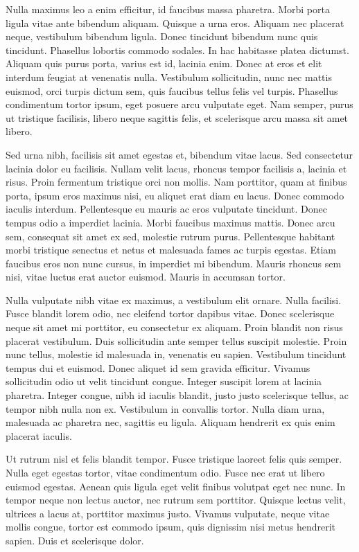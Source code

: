 Nulla maximus leo a enim efficitur, id faucibus massa pharetra. Morbi porta ligula vitae ante bibendum aliquam. Quisque a urna eros. Aliquam nec placerat neque, vestibulum bibendum ligula. Donec tincidunt bibendum nunc quis tincidunt. Phasellus lobortis commodo sodales. In hac habitasse platea dictumst. Aliquam quis purus porta, varius est id, lacinia enim. Donec at eros et elit interdum feugiat at venenatis nulla. Vestibulum sollicitudin, nunc nec mattis euismod, orci turpis dictum sem, quis faucibus tellus felis vel turpis. Phasellus condimentum tortor ipsum, eget posuere arcu vulputate eget. Nam semper, purus ut tristique facilisis, libero neque sagittis felis, et scelerisque arcu massa sit amet libero.

Sed urna nibh, facilisis sit amet egestas et, bibendum vitae lacus. Sed consectetur lacinia dolor eu facilisis. Nullam velit lacus, rhoncus tempor facilisis a, lacinia et risus. Proin fermentum tristique orci non mollis. Nam porttitor, quam at finibus porta, ipsum eros maximus nisi, eu aliquet erat diam eu lacus. Donec commodo iaculis interdum. Pellentesque eu mauris ac eros vulputate tincidunt. Donec tempus odio a imperdiet lacinia. Morbi faucibus maximus mattis. Donec arcu sem, consequat sit amet ex sed, molestie rutrum purus. Pellentesque habitant morbi tristique senectus et netus et malesuada fames ac turpis egestas. Etiam faucibus eros non nunc cursus, in imperdiet mi bibendum. Mauris rhoncus sem nisi, vitae luctus erat auctor euismod. Mauris in accumsan tortor.

Nulla vulputate nibh vitae ex maximus, a vestibulum elit ornare. Nulla facilisi. Fusce blandit lorem odio, nec eleifend tortor dapibus vitae. Donec scelerisque neque sit amet mi porttitor, eu consectetur ex aliquam. Proin blandit non risus placerat vestibulum. Duis sollicitudin ante semper tellus suscipit molestie. Proin nunc tellus, molestie id malesuada in, venenatis eu sapien. Vestibulum tincidunt tempus dui et euismod. Donec aliquet id sem gravida efficitur. Vivamus sollicitudin odio ut velit tincidunt congue. Integer suscipit lorem at lacinia pharetra. Integer congue, nibh id iaculis blandit, justo justo scelerisque tellus, ac tempor nibh nulla non ex. Vestibulum in convallis tortor. Nulla diam urna, malesuada ac pharetra nec, sagittis eu ligula. Aliquam hendrerit ex quis enim placerat iaculis.

Ut rutrum nisl et felis blandit tempor. Fusce tristique laoreet felis quis semper. Nulla eget egestas tortor, vitae condimentum odio. Fusce nec erat ut libero euismod egestas. Aenean quis ligula eget velit finibus volutpat eget nec nunc. In tempor neque non lectus auctor, nec rutrum sem porttitor. Quisque lectus velit, ultrices a lacus at, porttitor maximus justo. Vivamus vulputate, neque vitae mollis congue, tortor est commodo ipsum, quis dignissim nisi metus hendrerit sapien. Duis et scelerisque dolor.


